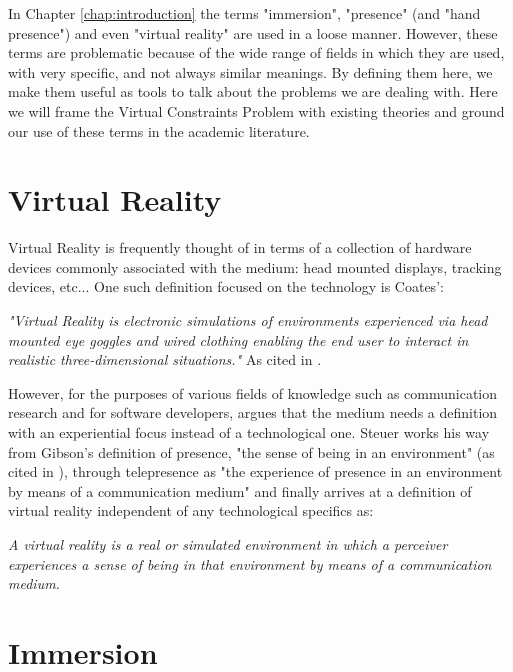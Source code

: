 In Chapter \ref{chap:introduction} the terms "immersion", "presence" (and "hand presence") and even "virtual reality" are used in a loose manner. However, these terms are problematic because of the wide range of fields in which they are used, with very specific, and not always similar meanings. By defining them here, we make them useful as tools to talk about the problems we are dealing with. Here we will frame the Virtual Constraints Problem with existing theories and ground our use of these terms in the academic literature.

\section{Virtual Reality}
\label{sec:vrDef}

Virtual Reality is frequently thought of in terms of a collection of hardware devices commonly associated with the medium: head mounted displays, tracking devices, etc... One such definition focused on the technology is Coates':

\begin{displayquote}
\textit{"Virtual Reality is electronic simulations of environments experienced via head mounted eye goggles and wired clothing enabling the end user to interact in realistic three-dimensional situations."} As cited in \parencite{Steuer1992}.
\end{displayquote}

However, for the purposes of various fields of knowledge such as communication research and for software developers, \parencite{Steuer1992} argues that the medium needs a definition with an experiential focus instead of a technological one. Steuer works his way from Gibson's definition of presence, "the sense of being in an environment" (as cited in \parencite{Steuer1992}), through telepresence as "the experience of presence in an environment by means of a communication medium" \parencite{Steuer1992} and finally arrives at a definition of virtual reality independent of any technological specifics as:

\begin{displayquote}
\textit{A virtual reality is a real or simulated environment in which a perceiver experiences a sense of being in that environment by means of a communication medium.} \parencite{Steuer1992}
\end{displayquote}

\section{Immersion}
\label{sec:immersion}

